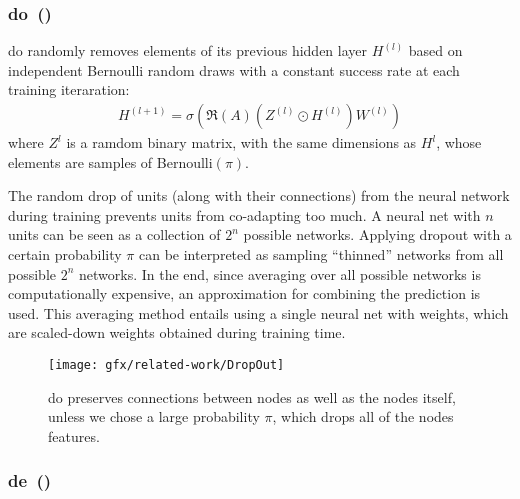 \subsubsection{\acl*{do}~(\citeauthor{Srivastava2014})}
\label{sec:related:pred:regularization:do}

\ac{do}\cite{Srivastava2014} randomly removes elements of its previous hidden
layer $H^{(l)}$ based on independent Bernoulli random draws with a constant success rate at each
training iteraration:
\begin{align*}
    H^{(l+1)} = \sigma(\mathfrak{R}(A)(Z^{(l)}\odot H^{(l)}) W^{(l)})
\end{align*}
where $Z^{l}$ is a ramdom binary matrix, with the same dimensions as $H^{l}$, whose
elements are samples of Bernoulli$(\pi)$.

The random drop of units (along with their connections) from the neural
network during training prevents units from co-adapting too much.
A neural net with $n$ units can be seen as a collection of $2^{n}$ possible networks.
Applying dropout with a certain probability $\pi$ can be interpreted as sampling
``thinned'' networks from all possible $2^{n}$ networks. In the end, since averaging over
all possible networks is computationally expensive, an approximation for
combining the prediction is used. This averaging method entails using
a single neural net with weights, which are scaled-down weights obtained during
training time. %
\begin{figure}[ht]
    \centering
    \texttt{[image: gfx/related-work/DropOut]}
    \caption{\acf{do} preserves connections between nodes as well as the
        nodes itself, unless we chose a large probability $\pi$, which drops all of the nodes
        features.}\label{fig:related:DropOut}
\end{figure}
\subsubsection{\acl*{de}~(\citeauthor{Rong2020})}
\label{sec:related:pred:regularization:de}


